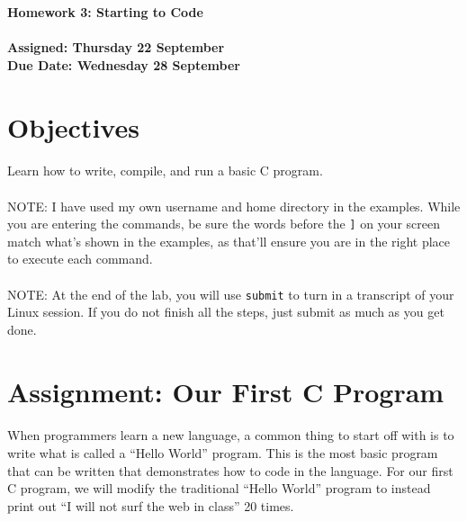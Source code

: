 \documentclass[letter,11pt]{article}
\begin{document}
\huge
\textbf{Homework 3: Starting to Code}
\normalsize
\\ ~~ \\
\textbf{Assigned: Thursday 22 September} \\
\textbf{Due Date: Wednesday 28 September}

\section*{Objectives}
\paragraph{}Learn how to write, compile, and run a basic C program.

\paragraph{}NOTE: I have used my own username and home directory in the examples. While you are entering the commands, be sure the words before the \texttt{]} on your screen match what’s shown in the examples, as that’ll ensure you are in the right place to execute each command.

\paragraph{}NOTE: At the end of the lab, you will use \texttt{submit} to turn in a transcript of your Linux session. If you do not finish all the steps, just submit as much as you get done.

\section*{Assignment: Our First C Program}
\paragraph{}When programmers learn a new language, a common thing to start off with is to write what is called a ``Hello World'' program. This is the most basic program that can be written that demonstrates how to code in the language. For our first C program, we will modify the traditional ``Hello World'' program to instead print out ``I will not surf the web in class'' 20 times.
\end{document}
